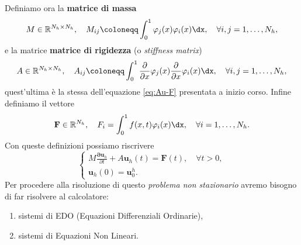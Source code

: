 Definiamo ora la \textbf{matrice di massa}
\begin{equation*}
M\in \mathbb{R}^{N_{h} \times N_{h}} ,\quad M_{ij} \coloneqq \int\nolimits ^{1}_{0} \varphi _{j}(x) \varphi _{i}(x) \dx,\quad \forall i,j=1,\dotsc ,N_{h} ,
\end{equation*}
e la matrice \textbf{matrice di rigidezza} (o \textit{stiffness matrix})
\begin{equation*}
A\in \mathbb{R}^{N_{h} \times N_{h}} ,\quad A_{ij} \coloneqq \int\nolimits ^{1}_{0}\frac{\partial }{\partial x} \varphi _{j}(x)\frac{\partial }{\partial x} \varphi _{i}(x) \dx,\quad \forall i,j=1,\dotsc ,N_{h} ,
\end{equation*}
quest'ultima è la stessa dell'equazione \eqref{eq:Au-F} presentata a inizio corso.
Infine definiamo il vettore
\begin{equation*}
\mathbf{F} \in \mathbb{R}^{N_{h}} ,\quad F_{i} =\int\nolimits ^{1}_{0} f( x,t) \varphi _{i}(x) \dx,\quad \forall i=1,\dotsc ,N_{h} .
\end{equation*}
Con queste definizioni possiamo riscrivere
\begin{equation*}\tag{EDO}
\begin{cases}
M\frac{\mathbf{\partial u}_{h}}{\partial t} +A\mathbf{u}_{h}(t) =\mathbf{F}(t) ,\quad \forall t >0,\\
\mathbf{u}_{h}(0) =\mathbf{u}^{h}_{0} .
\end{cases}
\end{equation*}
Per procedere alla risoluzione di questo \textit{problema non stazionario} avremo bisogno di far risolvere al calcolatore:
\begin{enumerate}
\item sistemi di EDO (Equazioni Differenziali Ordinarie),
\item sistemi di Equazioni Non Lineari.
\end{enumerate}

